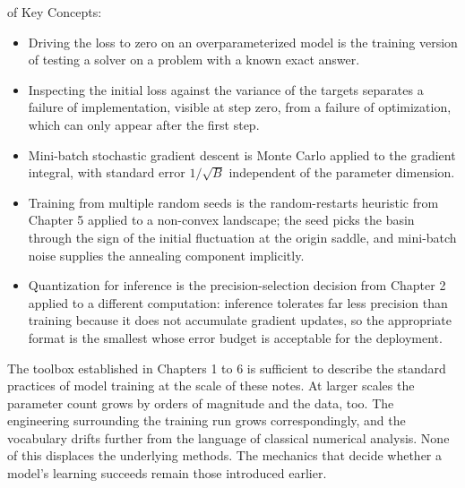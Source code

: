  of Key Concepts:
\begin{itemize}
    \item Driving the loss to zero on an overparameterized model is the training version of testing a solver on a problem with a known exact answer.
    \item Inspecting the initial loss against the variance of the targets separates a failure of implementation, visible at step zero, from a failure of optimization, which can only appear after the first step.
    \item Mini-batch stochastic gradient descent is Monte Carlo applied to the gradient integral, with standard error $1/\sqrt{B}$ independent of the parameter dimension.
    \item Training from multiple random seeds is the random-restarts heuristic from Chapter 5 applied to a non-convex landscape; the seed picks the basin through the sign of the initial fluctuation at the origin saddle, and mini-batch noise supplies the annealing component implicitly.
    \item Quantization for inference is the precision-selection decision from Chapter 2 applied to a different computation: inference tolerates far less precision than training because it does not accumulate gradient updates, so the appropriate format is the smallest whose error budget is acceptable for the deployment.
\end{itemize}


 The toolbox established in Chapters 1 to 6
is sufficient to describe the standard practices of model training at the scale of these notes.
At larger scales the parameter count grows by orders of magnitude and the data, too.
The engineering surrounding the training run grows correspondingly,
and the vocabulary drifts further from the language of classical numerical analysis.
None of this displaces the underlying methods.
The mechanics that decide whether a model's learning succeeds remain those introduced earlier.



